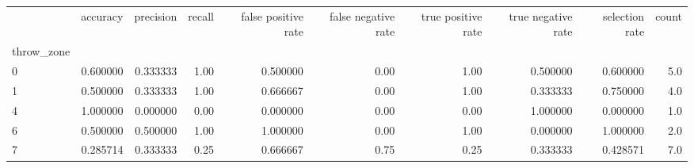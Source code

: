 \begin{tabular}{lrrrrrrrrr}
\toprule
{} &  accuracy &  precision &  recall &  false positive rate &  false negative rate &  true positive rate &  true negative rate &  selection rate &  count \\
throw\_zone &           &            &         &                      &                      &                     &                     &                 &        \\
\midrule
0          &  0.600000 &   0.333333 &    1.00 &             0.500000 &                 0.00 &                1.00 &            0.500000 &        0.600000 &    5.0 \\
1          &  0.500000 &   0.333333 &    1.00 &             0.666667 &                 0.00 &                1.00 &            0.333333 &        0.750000 &    4.0 \\
4          &  1.000000 &   0.000000 &    0.00 &             0.000000 &                 0.00 &                0.00 &            1.000000 &        0.000000 &    1.0 \\
6          &  0.500000 &   0.500000 &    1.00 &             1.000000 &                 0.00 &                1.00 &            0.000000 &        1.000000 &    2.0 \\
7          &  0.285714 &   0.333333 &    0.25 &             0.666667 &                 0.75 &                0.25 &            0.333333 &        0.428571 &    7.0 \\
\bottomrule
\end{tabular}
